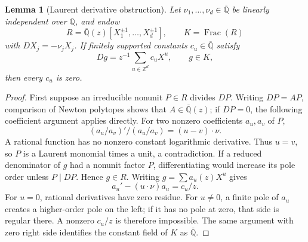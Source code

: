 \documentclass[11pt,a4paper]{article}
\newcommand{\Q}{\mathbb Q}
\newcommand{\Z}{\mathbb Z}
\newcommand{\Qbar}{\overline{\mathbb Q}}
\newtheorem{lemma}[theorem]{Lemma}
\theoremstyle{definition}
\theoremstyle{remark}
\numberwithin{equation}{section}
\begin{document}
\begin{lemma}[Laurent derivative obstruction]\label{fd:lem:laurent}
Let $\nu_1,\ldots,\nu_d\in\Qbar$ be linearly independent over $\Q$,
and endow
\[
 R=\Qbar(z)[X_1^{\pm1},\ldots,X_d^{\pm1}],\qquad K=\operatorname{Frac}(R)
\]
with $D X_j=-\nu_jX_j$.  If finitely supported constants $c_u\in\Qbar$
satisfy
\[
 Dg=z^{-1}\sum_{u\in\Z^d}c_uX^u,\qquad g\in K,
\]
then every $c_u$ is zero.
\end{lemma}
\begin{proof}
First suppose an irreducible nonunit $P\in R$ divides $DP$.  Writing
$DP=AP$, comparison of Newton polytopes shows that $A\in\Qbar(z)$;
if $DP=0$, the following coefficient argument applies directly.
For two nonzero coefficients $a_u,a_v$ of $P$,
\[
 (a_u/a_v)'/(a_u/a_v)=(u-v)\cdot\nu.
\]
A rational function has no nonzero constant logarithmic derivative.
Thus $u=v$, so $P$ is a Laurent monomial times a unit, a contradiction.
If a reduced denominator of $g$ had a nonunit factor $P$, differentiating
would increase its pole order unless $P\mid DP$.  Hence $g\in R$.
Writing $g=\sum a_u(z)X^u$ gives
\[
 a_u'-(u\cdot\nu)a_u=c_u/z.
\]
For $u=0$, rational derivatives have zero residue.  For $u\ne0$, a finite
pole of $a_u$ creates a higher-order pole on the left; if it has no pole
at zero, that side is regular there.  A nonzero $c_u/z$ is therefore
impossible.  The same argument with zero right side identifies the
constant field of $K$ as $\Qbar$.
\end{proof}
\end{document}

